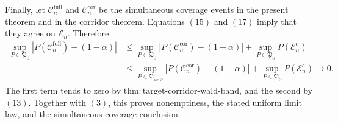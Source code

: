 Finally, let \(\mathcal C_n^{\mathrm{full}}\) and
\(\mathcal C_n^{\mathrm{cor}}\) be the simultaneous coverage events in the
present theorem and in the corridor theorem.  Equations \((15)\) and
\((17)\) imply that they agree on \(\mathcal E_n\).  Therefore
\[
\begin{split}
 \sup_{P\in\mathfrak P_{\partial}}
 \left|P(\mathcal C_n^{\mathrm{full}})-(1-\alpha)\right|
 &\leq
 \sup_{P\in\mathfrak P_{\partial}}
 \left|P(\mathcal C_n^{\mathrm{cor}})-(1-\alpha)\right|
 +\sup_{P\in\mathfrak P_{\partial}}P(\mathcal E_n^c)\\
 &\leq
 \sup_{P\in\mathfrak P_{uv,\partial}}
 \left|P(\mathcal C_n^{\mathrm{cor}})-(1-\alpha)\right|
 +\sup_{P\in\mathfrak P_{\partial}}P(\mathcal E_n^c)
 \longrightarrow0.
\end{split}
 \tag{18}
\]
The first term tends to zero by
\(\mathrm{thm{:}target\mbox{-}corridor\mbox{-}wald\mbox{-}band}\), and
the second by \((13)\).  Together with \((3)\), this proves nonemptiness,
the stated uniform limit law, and the simultaneous coverage conclusion.
